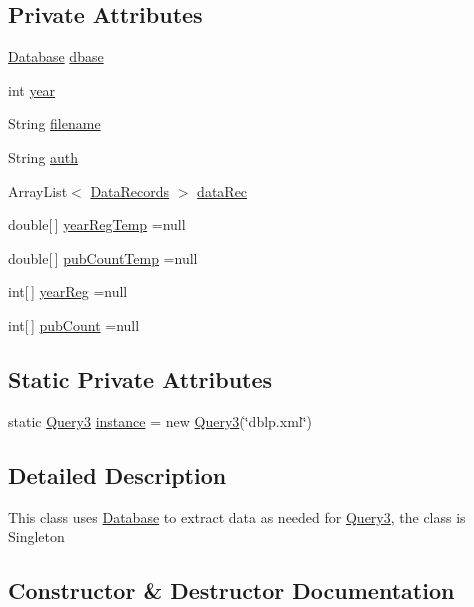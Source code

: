\subsection*{Private Attributes}
\begin{DoxyCompactItemize}
\item 
\hyperlink{classDatabase}{Database} \hyperlink{classQuery3_acf21ca7cef4efec2a30d041d8b0770f1}{dbase}
\item 
int \hyperlink{classQuery3_a0bae9f7c878eeda85345866f6983caae}{year}
\item 
String \hyperlink{classQuery3_a53f8993bc386e315c22cace0c0405336}{filename}
\item 
String \hyperlink{classQuery3_a2db45c9e219ad331a52169d8f6bacae5}{auth}
\item 
Array\+List$<$ \hyperlink{classDataRecords}{Data\+Records} $>$ \hyperlink{classQuery3_af5c1e99f9d5402273b0a993aa965a6d2}{data\+Rec}
\item 
double\mbox{[}$\,$\mbox{]} \hyperlink{classQuery3_a8357a655699bb076c9174af9c95f00b1}{year\+Reg\+Temp} =null
\item 
double\mbox{[}$\,$\mbox{]} \hyperlink{classQuery3_aa4820280feefd8ebe9c04b42b73c8f52}{pub\+Count\+Temp} =null
\item 
int\mbox{[}$\,$\mbox{]} \hyperlink{classQuery3_ada9c7e6f4d53607da9450738b76dbc7d}{year\+Reg} =null
\item 
int\mbox{[}$\,$\mbox{]} \hyperlink{classQuery3_af016450dd2c9582f3ef5b2979969d201}{pub\+Count} =null
\end{DoxyCompactItemize}
\subsection*{Static Private Attributes}
\begin{DoxyCompactItemize}
\item 
static \hyperlink{classQuery3}{Query3} \hyperlink{classQuery3_a21e9b649c7b92dcd18831c6a1471454a}{instance} = new \hyperlink{classQuery3}{Query3}(\char`\"{}dblp.\+xml\char`\"{})
\end{DoxyCompactItemize}


\subsection{Detailed Description}
This class uses \hyperlink{classDatabase}{Database} to extract data as needed for \hyperlink{classQuery3}{Query3}, the class is Singleton 

\subsection{Constructor \& Destructor Documentation}
